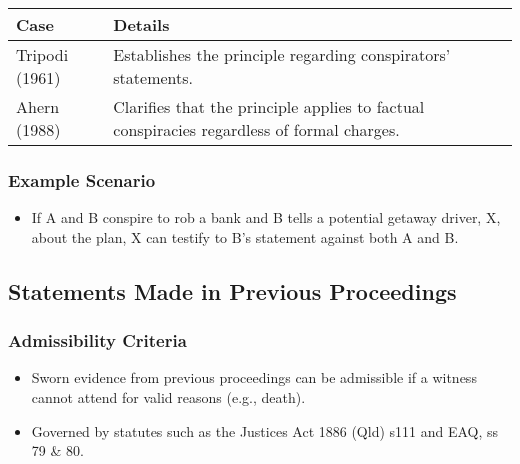 \begin{longtable}[]{@{}
  >{\raggedright\arraybackslash}p{}
  >{\raggedright\arraybackslash}p{}@{}}
\toprule\noalign{}
\begin{minipage}[b]{\linewidth}\raggedright
Case
\end{minipage} & \begin{minipage}[b]{\linewidth}\raggedright
Details
\end{minipage} \\
\midrule\noalign{}
\endhead
\bottomrule\noalign{}
\endlastfoot
Tripodi (1961) & Establishes the principle regarding conspirators'
statements. \\
Ahern (1988) & Clarifies that the principle applies to factual
conspiracies regardless of formal charges. \\
\end{longtable}

\subsubsection{Example Scenario}\label{example-scenario-1}

\begin{itemize}
\tightlist
\item
  If A and B conspire to rob a bank and B tells a potential getaway
  driver, X, about the plan, X can testify to B's statement against both
  A and B.
\end{itemize}

\subsection{  Statements Made in Previous
Proceedings}\label{statements-made-in-previous-proceedings}

\subsubsection{Admissibility Criteria}\label{admissibility-criteria-2}

\begin{itemize}
\tightlist
\item
  Sworn evidence from previous proceedings can be admissible if a
  witness cannot attend for valid reasons (e.g., death).
\item
  Governed by statutes such as the Justices Act 1886 (Qld) s111 and EAQ,
  ss 79 \& 80.
\end{itemize}

